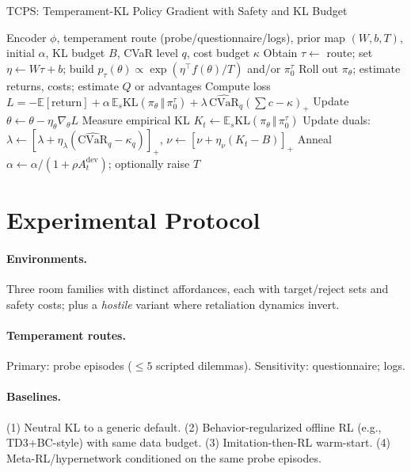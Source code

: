 \documentclass[10pt]{article}
\theoremstyle{plain}
\theoremstyle{definition}
\theoremstyle{remark}
\newcommand{\E}{\mathbb{E}}
\newcommand{\1}{\mathds{1}}
\newcommand{\KL}{\mathrm{KL}}
\newcommand{\cvar}{\mathrm{CVaR}}
\newcommand{\grad}{\nabla}
\begin{document}
\begin{algorithm}[H]
\caption{TCPS: Temperament-KL Policy Gradient with Safety and KL Budget}
\label{alg:tcps}
\begin{algorithmic}[1]
\Require Encoder $\phi$, temperament route (probe/questionnaire/logs), prior map $(W,b,T)$, initial $\alpha$, KL budget $B$, CVaR level $q$, cost budget $\kappa$
\State Obtain $\tau\leftarrow$ route; set $\eta\!\leftarrow W\tau+b$; build $p_\tau(\theta)\propto \exp(\eta^\top f(\theta)/T)$ and/or $\pi_0^\tau$
  \State Roll out $\pi_\theta$; estimate returns, costs; estimate $Q$ or advantages
  \State Compute loss $L = -\E[\text{return}] + \alpha\, \E_s \KL(\pi_\theta\,\Vert\,\pi_0^\tau) + \lambda\, \hat{\cvar}_q(\sum c-\kappa)_+$
  \State Update $\theta \leftarrow \theta - \eta_\theta \grad_\theta L$
  \State Measure empirical KL $K_t \leftarrow \E_s \KL(\pi_\theta\,\Vert\,\pi_0^\tau)$
  \State Update duals: $\lambda \leftarrow [\lambda + \eta_\lambda (\hat{\cvar}_q - \kappa_q)]_+$,\quad
   $\nu \leftarrow [\nu + \eta_\nu (K_t - B)]_+$
  \State Anneal $\alpha \leftarrow \alpha / (1+\rho A^\mathrm{dev}_t)$; optionally raise $T$
\EndFor
\end{algorithmic}
\end{algorithm}

\section{Experimental Protocol}
\label{sec:experiments}

\paragraph{Environments.}
Three room families with distinct affordances, each with target/reject sets and safety costs; plus a \emph{hostile} variant where retaliation dynamics invert.

\paragraph{Temperament routes.}
Primary: probe episodes ($\leq 5$ scripted dilemmas). Sensitivity: questionnaire; logs.

\paragraph{Baselines.}
(1) Neutral KL to a generic default. (2) Behavior-regularized offline RL (e.g., TD3+BC-style) with same data budget. (3) Imitation-then-RL warm-start. (4) Meta-RL/hypernetwork conditioned on the same probe episodes.
\end{document}
